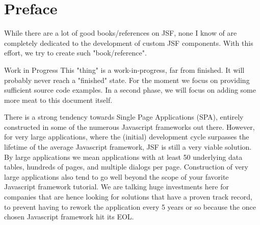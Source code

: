%

\chapter*{Preface}
While there are a lot of good books/references on JSF, none I know of are completely dedicated to the development of custom JSF components.
With this effort, we try to create such "book/reference".

\begin{TODO}{Work in Progress}
	This "thing" is a work-in-progress, far from finished.
	It will probably never reach a "finished" state.
	For the moment we focus on providing sufficient source code examples.
	In a second phase, we will focus on adding some more meat to this document itself.
\end{TODO}

There is a strong tendency towards Single Page Applications (SPA), entirely constructed in some of the numerous Javascript frameworks out there.
However, for very large applications, where the (initial) development cycle surpasses the lifetime of the average Javascript framework, JSF is still a very viable solution.
By large applications we mean applications with at least 50 underlying data tables, hundreds of pages, and multiple dialogs per page.
Construction of very large applications also tend to go well beyond the scope of your favorite Javascript framework tutorial.
We are talking huge investments here for companies that are hence looking for solutions that have a proven track record, to prevent having to rework the application every 5 years or so because the once chosen Javascript framework hit its EOL.

